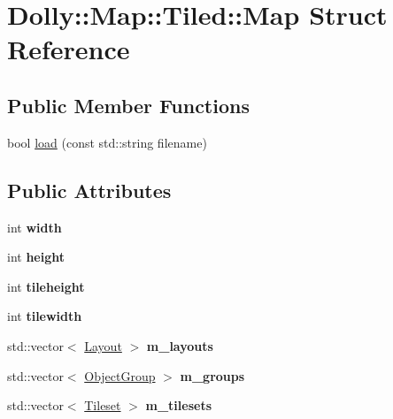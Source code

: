 \hypertarget{struct_dolly_1_1_map_1_1_tiled_1_1_map}{}\section{Dolly\+:\+:Map\+:\+:Tiled\+:\+:Map Struct Reference}
\label{struct_dolly_1_1_map_1_1_tiled_1_1_map}
\subsection*{Public Member Functions}
\begin{DoxyCompactItemize}
\item 
bool \hyperlink{struct_dolly_1_1_map_1_1_tiled_1_1_map_aa0abfd16a653562bd644696cd6645db4}{load} (const std\+::string filename)
\end{DoxyCompactItemize}
\subsection*{Public Attributes}
\begin{DoxyCompactItemize}
\item 
\mbox{\label{struct_dolly_1_1_map_1_1_tiled_1_1_map_abf86fce58a83e7c46a14ad6f984b394b}} 
int {\bfseries width}
\item 
\mbox{\label{struct_dolly_1_1_map_1_1_tiled_1_1_map_a3b02cd2878598aa46534fb534023d6e0}} 
int {\bfseries height}
\item 
\mbox{\label{struct_dolly_1_1_map_1_1_tiled_1_1_map_ad106d471feaabbc1be6d43b802ab65a2}} 
int {\bfseries tileheight}
\item 
\mbox{\label{struct_dolly_1_1_map_1_1_tiled_1_1_map_a7b58e205fa4008c633cdf5d9bbdc0fd4}} 
int {\bfseries tilewidth}
\item 
\mbox{\label{struct_dolly_1_1_map_1_1_tiled_1_1_map_a0e3f8476f1fd03f8d387afe4680818d0}} 
std\+::vector$<$ \hyperlink{struct_dolly_1_1_map_1_1_tiled_1_1_layout}{Layout} $>$ {\bfseries m\+\_\+layouts}
\item 
\mbox{\label{struct_dolly_1_1_map_1_1_tiled_1_1_map_a8f8c71ac033791b2d5174ab8c8742c0d}} 
std\+::vector$<$ \hyperlink{struct_dolly_1_1_map_1_1_tiled_1_1_object_group}{Object\+Group} $>$ {\bfseries m\+\_\+groups}
\item 
\mbox{\label{struct_dolly_1_1_map_1_1_tiled_1_1_map_a62839bdbeff47b0af278dacd7fb9cfef}} 
std\+::vector$<$ \hyperlink{struct_dolly_1_1_map_1_1_tiled_1_1_tileset}{Tileset} $>$ {\bfseries m\+\_\+tilesets}
\end{DoxyCompactItemize}


